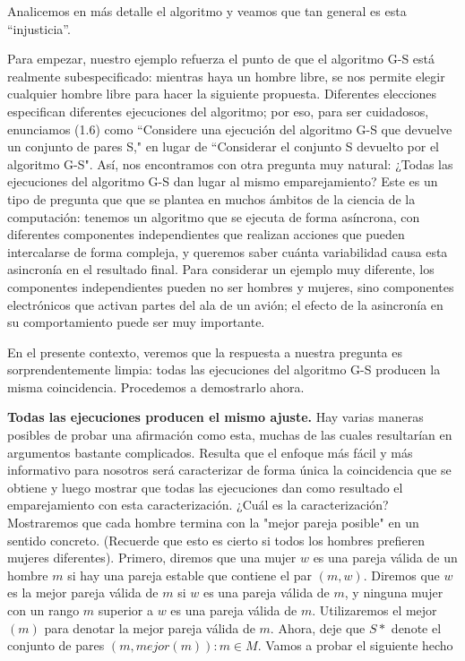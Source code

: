\documentclass[a4paper, 12pt]{book}
\begin{document}
Analicemos en más detalle el algoritmo y veamos que tan general es esta ``injusticia''.

Para empezar, nuestro ejemplo refuerza el punto de que el algoritmo G-S está realmente subespecificado: mientras haya un hombre libre, se nos permite elegir cualquier hombre libre para hacer la siguiente propuesta. Diferentes elecciones especifican diferentes ejecuciones del algoritmo; por eso, para ser cuidadosos, enunciamos (1.6) como ``Considere una ejecución del algoritmo G-S que devuelve un conjunto de pares S," en lugar de ``Considerar el conjunto S devuelto por el algoritmo G-S". Así, nos encontramos con otra pregunta muy natural: ¿Todas las ejecuciones del algoritmo G-S dan lugar al mismo emparejamiento? Este es un tipo de pregunta que que se plantea en muchos ámbitos de la ciencia de la computación: tenemos un algoritmo que se ejecuta de forma asíncrona, con diferentes componentes independientes que realizan acciones que pueden intercalarse de forma compleja, y queremos saber cuánta variabilidad causa esta asincronía en el resultado final. Para considerar un ejemplo muy diferente, los componentes independientes pueden no ser hombres y mujeres, sino componentes electrónicos que activan partes del ala de un avión; el efecto de la asincronía en su comportamiento puede ser muy importante.

En el presente contexto, veremos que la respuesta a nuestra pregunta es sorprendentemente limpia: todas las ejecuciones del algoritmo G-S producen la misma coincidencia. Procedemos a demostrarlo ahora.

\textbf{Todas las ejecuciones producen el mismo ajuste.}
Hay varias maneras posibles de probar una afirmación como esta, muchas de las cuales resultarían en argumentos bastante complicados. Resulta que el enfoque más fácil y más informativo para nosotros será caracterizar de forma única la coincidencia que se obtiene y luego mostrar que todas las ejecuciones dan como resultado el emparejamiento con esta caracterización.
¿Cuál es la caracterización? Mostraremos que cada hombre termina con la "mejor pareja posible" en un sentido concreto. (Recuerde que esto es cierto si todos los hombres prefieren mujeres diferentes). Primero, diremos que una mujer $w$ es una pareja válida de un hombre $m$ si hay una pareja estable que contiene el par $(m, w)$. Diremos que $w$ es la mejor pareja válida de $m$ si $w$ es una pareja válida de $m$, y ninguna mujer con un rango $m$ superior a $w$ es una pareja válida de $m$. Utilizaremos el mejor $(m)$ para denotar la mejor pareja válida de $m$. Ahora, deje que $S*$ denote el conjunto de pares ${(m, mejor (m)): m  \in  M}$. Vamos a probar el siguiente hecho
\end{document}
